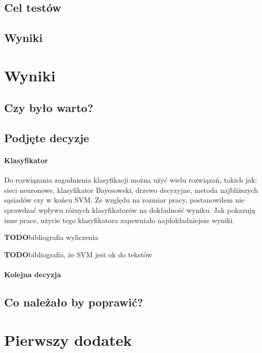 \documentclass[a4paper,12pt,twoside,openany]{report}
\newcommand{\TODO}{\textbf{TODO}}
\begin{document}
\section{Cel testów}
\section{Wyniki}

\chapter{Wyniki}
\section{Czy było warto?}
\section{Podjęte decyzje}
\subsubsection{Klasyfikator}
Do rozwiązania zagadnienia klasyfikacji można użyć wielu rozwiązań, takich jak: sieci neuronowe, klasyfikator Bayesowski, drzewo decyzyjne, metoda najbliższych sąsiadów czy w końcu SVM. Ze względu na rozmiar pracy, postanowiłem nie sprawdzać wpływu różnych klasyfikatorów na dokładność wyniku. Jak pokazują inne prace, użycie tego klasyfikatora zapewniało najdokładniejsze wyniki.

\TODO {bibliografia wyliczenia}

\TODO {bibliografia, że SVM jest ok do tekstów}

\subsubsection{Kolejna decyzja}

\section{Co należało by poprawić?}



\appendix
\chapter{Pierwszy dodatek} 

\begin{thebibliography}{99}

\end{thebibliography}

\zakonczenie  %
\end{document}

